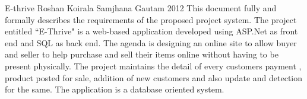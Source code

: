  \begin{conf-abstract}[]
{E-thrive}
{
Roshan Koirala
Samjhana Gautam
}
{2012}
This document fully and formally describes the requirements of the proposed
project system. The project entitled ``E-Thrive" is a web-based application
developed using ASP.Net as front end and SQL as back end. The agenda is
designing an online site to allow buyer and seller to help purchase and sell
their items online without having to be present physically. The project maintains
the detail of every customers payment , product posted for sale, addition of new
customers and also update and detection for the same. The application is a
database oriented system.
  \end{conf-abstract}